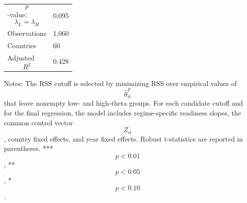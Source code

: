 \begin{table}[H]
\begin{threeparttable}
\begin{tabularx}{\textwidth}{lY}
$$p$$-value: $$\lambda_L=\lambda_H$$ & 0.095 \\
Observations & 1,060 \\
Countries & 60 \\
Adjusted $$R^2$$ & 0.428 \\
\bottomrule
\end{tabularx}
\begin{tablenotes}[flushleft]\footnotesize
\item Notes: The RSS cutoff is selected by minimizing RSS over empirical values of $$\widehat{\theta}^{F}_{it}$$ that leave nonempty low- and high-theta groups. For each candidate cutoff and for the final regression, the model includes regime-specific readiness slopes, the common control vector $$Z_{it}$$, country fixed effects, and year fixed effects. Robust t-statistics are reported in parentheses. *** $$p<0.01$$, ** $$p<0.05$$, * $$p<0.10$$.
\end{tablenotes}
\end{threeparttable}
\end{table}
